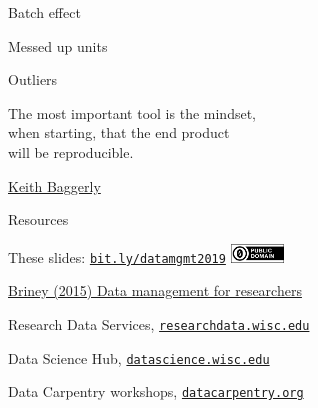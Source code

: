 \documentclass[aspectratio=169,12pt,t]{beamer}
\begin{document}
\begin{frame}[c]{Batch effect}




\end{frame}



\begin{frame}[c]{Messed up units}



\end{frame}



\begin{frame}[c]{Outliers}


\end{frame}




\begin{frame}[c]{}

\begin{center}
\large
The most important tool is the {\hilit mindset},\\
when starting, that the end product \\
will be reproducible.
\end{center}

\hfill
{\lolit
{\textendash} \href{http://odin.mdacc.tmc.edu/~kabaggerly/}{Keith Baggerly}
}

\end{frame}



\begin{frame}[c]{Resources}

  \bbi
\item These slides: \href{https://bit.ly/datamgmt2019}{\tt bit.ly/datamgmt2019} \quad
\includegraphics[height=5mm]{Figs/cc-zero.png}
\item \href{https://www.amazon.com/gp/product/B019NDNOMA?ie=UTF8&tag=7210-20}{Briney (2015) Data management for researchers}
\item Research Data Services,
  \href{http://researchdata.wisc.edu/}{\tt researchdata.wisc.edu}
\item Data Science Hub,
  \href{https://datascience.wisc.edu/}{\tt datascience.wisc.edu}
\item Data Carpentry workshops,
  \href{https://datacarpentry.org/}{\tt datacarpentry.org}
  \ei

\end{frame}
\end{document}
